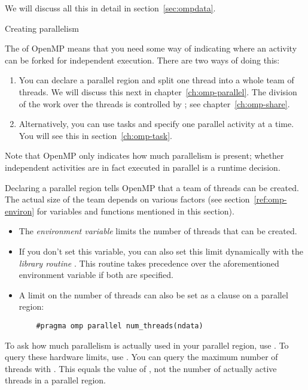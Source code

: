 We will discuss all this in detail in section~\ref{sec:ompdata}.

 {Creating parallelism}
\label{sec:omp-howmany}

The  of OpenMP means that you need some way of
indicating where an activity can be forked for independent execution.
There are two ways of doing this:
\begin{enumerate}
\item You can declare a parallel region and
  split one thread into a whole team of threads.
  We will discuss this next in chapter~\ref{ch:omp-parallel}.
  The division of the work over the threads
  is controlled by ;
  see chapter~\ref{ch:omp-share}.
\item Alternatively, you can use tasks and specify one parallel
  activity at a time. You will see this in section~\ref{ch:omp-task}.
\end{enumerate}

Note that OpenMP only indicates how much parallelism is present;
whether independent activities are in fact executed in parallel
is a runtime decision.

Declaring a parallel region tells OpenMP that a team of threads can be created.
The actual size of the team depends on various factors (see section~\ref{ref:omp-environ}
for variables and functions mentioned in this section).
\begin{itemize}
\item The \emph{environment variable}
   limits the number of
  threads that can be created.
\item If you don't set this variable, you can also set this limit
  dynamically with the \emph{library routine} . This routine takes
  precedence over the aforementioned environment variable if both are
  specified.
\item A limit on the number of threads can also be set as a
   clause on a parallel region:
  \begin{lstlisting}
    #pragma omp parallel num_threads(ndata)
  \end{lstlisting}
\end{itemize}

To ask how much parallelism is actually used in your parallel region,
use . To query these hardware limits,
use .
You can query the maximum number of threads with .
This equals the value of ,
not the number of actually active threads in a parallel region.


